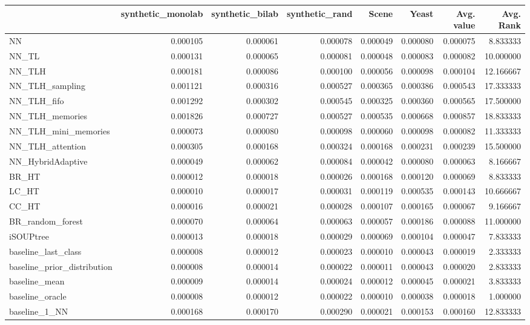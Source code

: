 \begin{tabular}{lrrrrrrr}
\toprule
 & synthetic_monolab & synthetic_bilab & synthetic_rand & Scene & Yeast & Avg. value & Avg. Rank \\
\midrule
NN & 0.000105 & 0.000061 & 0.000078 & 0.000049 & 0.000080 & 0.000075 & 8.833333 \\
NN_TL & 0.000131 & 0.000065 & 0.000081 & 0.000048 & 0.000083 & 0.000082 & 10.000000 \\
NN_TLH & 0.000181 & 0.000086 & 0.000100 & 0.000056 & 0.000098 & 0.000104 & 12.166667 \\
NN_TLH_sampling & 0.001121 & 0.000316 & 0.000527 & 0.000365 & 0.000386 & 0.000543 & 17.333333 \\
NN_TLH_fifo & 0.001292 & 0.000302 & 0.000545 & 0.000325 & 0.000360 & 0.000565 & 17.500000 \\
NN_TLH_memories & 0.001826 & 0.000727 & 0.000527 & 0.000535 & 0.000668 & 0.000857 & 18.833333 \\
NN_TLH_mini_memories & 0.000073 & 0.000080 & 0.000098 & 0.000060 & 0.000098 & 0.000082 & 11.333333 \\
NN_TLH_attention & 0.000305 & 0.000168 & 0.000324 & 0.000168 & 0.000231 & 0.000239 & 15.500000 \\
NN_HybridAdaptive & 0.000049 & 0.000062 & 0.000084 & 0.000042 & 0.000080 & 0.000063 & 8.166667 \\
BR_HT & 0.000012 & 0.000018 & 0.000026 & 0.000168 & 0.000120 & 0.000069 & 8.833333 \\
LC_HT & 0.000010 & 0.000017 & 0.000031 & 0.000119 & 0.000535 & 0.000143 & 10.666667 \\
CC_HT & 0.000016 & 0.000021 & 0.000028 & 0.000107 & 0.000165 & 0.000067 & 9.166667 \\
BR_random_forest & 0.000070 & 0.000064 & 0.000063 & 0.000057 & 0.000186 & 0.000088 & 11.000000 \\
iSOUPtree & 0.000013 & 0.000018 & 0.000029 & 0.000069 & 0.000104 & 0.000047 & 7.833333 \\
baseline_last_class & 0.000008 & 0.000012 & 0.000023 & 0.000010 & 0.000043 & 0.000019 & 2.333333 \\
baseline_prior_distribution & 0.000008 & 0.000014 & 0.000022 & 0.000011 & 0.000043 & 0.000020 & 2.833333 \\
baseline_mean & 0.000009 & 0.000014 & 0.000024 & 0.000012 & 0.000045 & 0.000021 & 3.833333 \\
baseline_oracle & 0.000008 & 0.000012 & 0.000022 & 0.000010 & 0.000038 & 0.000018 & 1.000000 \\
baseline_1_NN & 0.000168 & 0.000170 & 0.000290 & 0.000021 & 0.000153 & 0.000160 & 12.833333 \\
\bottomrule
\end{tabular}
